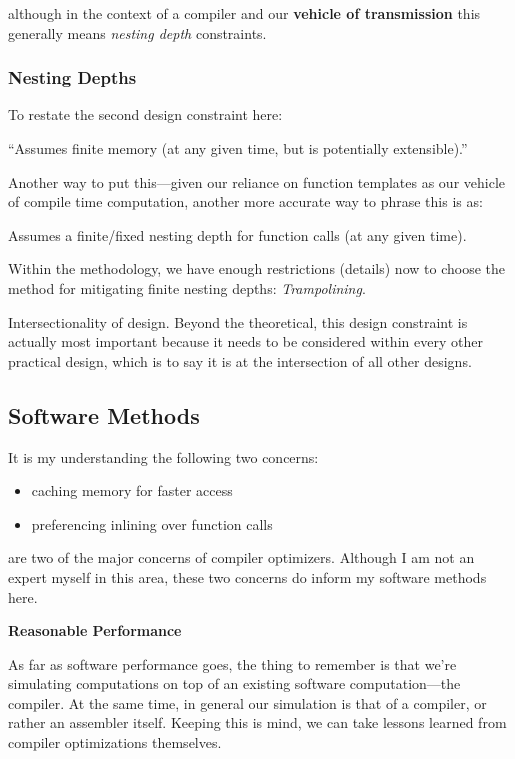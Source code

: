 \documentclass[twoside]{article}
\newcommand{\strong}[1]{{\bfseries #1}}
\begin{document}
although in the context of a compiler and our \strong{vehicle of transmission} this generally means \emph{nesting depth} constraints.

\subsubsection*{Nesting Depths}

To restate the second design constraint here:

\begin{center}
``Assumes finite memory (at any given time, but is potentially extensible).''
\end{center}

Another way to put this---given our reliance on function templates as our vehicle of compile time computation,
another more accurate way to phrase this is as:

\begin{center}
Assumes a finite/fixed nesting depth for function calls (at any given time).
\end{center}

Within the methodology, we have enough restrictions (details) now to choose the method for mitigating finite
nesting depths: \emph{Trampolining}.

Intersectionality of design. Beyond the theoretical, this design constraint is actually most important because
it needs to be considered within every other practical design, which is to say it is at the intersection of all
other designs.

\subsection*{Software Methods}

It is my understanding the following two concerns:
\begin{itemize}
\item caching memory for faster access
\item preferencing inlining over function calls
\end{itemize}
are two of the major concerns of compiler optimizers. Although I am not an expert myself in this area,
these two concerns do inform my software methods here.

\strong{Reasonable Performance}

As far as software performance goes, the thing to remember is that we're simulating computations on top of
an existing software computation---the compiler. At the same time, in general our simulation is that of a compiler,
or rather an assembler itself. Keeping this is mind, we can take lessons learned from compiler optimizations themselves.
\end{document}
